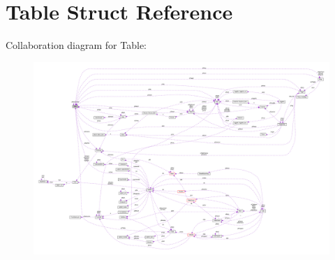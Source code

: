 \hypertarget{struct_table}{\section{Table Struct Reference}
\label{struct_table}
}


Collaboration diagram for Table\-:\nopagebreak
\begin{figure}[H]
\begin{center}
\leavevmode
\includegraphics[width=350pt]{struct_table__coll__graph}
\end{center}
\end{figure}
